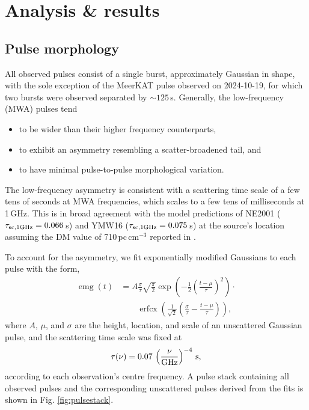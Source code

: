 \documentclass[preprint2,linenumbers]{aastex631}
\DeclareMathOperator{\erfcx}{erfcx}
\DeclareMathOperator{\emg}{emg}
\begin{document}
\section{Analysis \& results} \label{sec:analysis}


\subsection{Pulse morphology}

All observed pulses consist of a single burst, approximately Gaussian in shape, with the sole exception of the MeerKAT pulse observed on 2024-10-19, for which two bursts were observed separated by ${\sim}125\,$s.
Generally, the low-frequency (MWA) pulses tend
\begin{itemize}
    \item to be wider than their higher frequency counterparts,
    \item to exhibit an asymmetry resembling a scatter-broadened tail, and
    \item to have minimal pulse-to-pulse morphological variation.
\end{itemize}

The low-frequency asymmetry is consistent with a scattering time scale of a few tens of seconds at MWA frequencies, which scales to a few tens of milliseconds at 1\,GHz.
This is in broad agreement with the model predictions of NE2001 ($\tau_{\rm sc,1GHz} = 0.066\,$s) and YMW16 ($\tau_{\rm sc,1 GHz} = 0.075\,$s) at the source's location assuming the DM value of 710\,pc\,cm$^{-3}$ reported in .

To account for the asymmetry, we fit exponentially modified Gaussians to each pulse with the form,
\begin{equation}
  \begin{aligned}
        \emg(t) &= A \frac{\sigma}{\tau}\sqrt{\frac{\pi}{2}}
                   \exp\left(-\frac12 \left( \frac{t - \mu}{\tau} \right)^2 \right) \cdot {} \\
                            &\qquad \erfcx \left(\frac{1}{\sqrt{2}} \left(\frac{\sigma}{\tau} 
                             - \frac{t - \mu}{\tau} \right) \right),
  \end{aligned}
  \label{eqn:emg}
\end{equation}
where $A$, $\mu$, and $\sigma$ are the height, location, and scale of an unscattered Gaussian pulse, and the scattering time scale was fixed at
\begin{equation}
      \tau(\nu) = 0.07\, \left(\frac{\nu}{\rm GHz}\right)^{-4} \, {\rm s},
\end{equation}
according to each observation's centre frequency.
A pulse stack containing all observed pulses and the corresponding unscattered pulses derived from the fits is shown in Fig. \ref{fig:pulsestack}.
\end{document}
